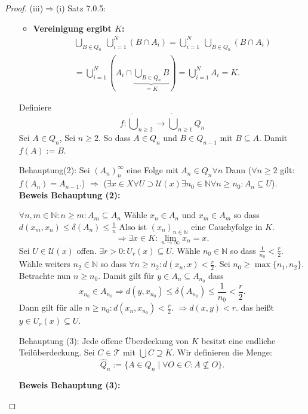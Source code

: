 \begin{proof}{(iii)$\Rightarrow$(i) Satz 7.0.5:}
\begin{itemize}
{\begin{itemize}
    \item \textbf{Vereinigung ergibt $K$:}
    \begin{equation*}
    \begin{split}
        &\bigcup_{B \in Q_n} \ \bigcup_{i=1}^N (B \cap A_i) 
        = \bigcup_{i=1}^N \ \bigcup_{B \in Q_n} (B \cap A_i) \\
        &= \bigcup_{i=1}^N ( A_i \cap \underbrace{\bigcup_{B \in Q_n} B}_{=K} ) 
        = \bigcup_{i=1}^N A_i = K.
    \end{split}
    \end{equation*}
\end{itemize}
}
Definiere 
$$
f: \dot{\bigcup}_{n\geq 2} \to \dot{\bigcup}_{n \geq 1}Q_n
$$
Sei $A \in Q_n$, Sei $n\geq 2$. So dass $A \in Q_n$ und $B \in Q_{n-1}$
 mit $B \subseteq A$. 
Damit $f(A) := B$.
\item[Behauptung(2):] Sei $(A_n)_{n}^{\infty}$ eine Folge mit $A_n \in Q_n \forall n$
Dann ($\forall n \geq 2$ gilt: $f(A_n) = A_{n-1}$.)
$\Rightarrow$
 ($\exists  x \in X \forall U \supset \mathcal{U}(x)
\exists n_0 \in \mathbb{N}\forall n \geq n_0: A_n \subseteq U$).\\


\textbf{Beweis Behauptung (2):}

$\forall n, m \in \mathbb{N}: n \geq m : A_m \subseteq A_n $
Wähle $x_n \in A_n$ und $x_m \in A_m$ so dass
$ d(x_m,x_n) \leq \delta(A_n)\leq \frac{1}{n}$
Also ist $(x_n)_{n \in \mathbb{N}}$ eine Cauchyfolge in $K$.\\
$$
\Rightarrow \exists x \in K : \lim_{n \to \infty} x_n = x.
$$
Sei $U \in \mathcal{U}(x)$ offen.
$\exists r > 0: U_r(x) \subseteq U$.
Wähle $n_0 \in \mathbb{N}$ so dass $\frac{1}{n_0} < \frac{r}{2}$.
Wähle weiters $n_2 \in \mathbb{N}$ so dass $\forall n \geq n_2: d(x_n,x) < \frac{r}{2}$.
Sei $n_0 \geq \max\{n_1,n_2\}$.
Betrachte nun $n \geq n_0$.
Damit gilt für $y \in A_n \subseteq A_{n_0}$ dass
$$
x_{n_0} \in A_{n_0} \Rightarrow d(y,x_{n_0}) \leq \delta(A_{n_0}) 
\leq \frac{1}{n_0} < \frac{r}{2}.
$$
Dann gilt für alle $n \geq n_0: d(x_n,x_{n_0}) < \frac{r}{2}$.
$\Rightarrow d(x,y) < r$. das heißt $y \in U_r(x) \subseteq U$.

\item[Behauptung (3):] 
Jede offene Überdeckung von $K$ besitzt eine endliche Teilüberdeckung.
Sei $C \in \mathcal{T}$ mit $\bigcup C \supseteq K$.
Wir definieren die Menge:
$$
\hat{Q}_n := \{ A \in Q_n \mid \forall O \in C: A \not\subseteq O \}.
$$


\textbf{Beweis Behauptung (3):}


\end{itemize}
\end{proof}
